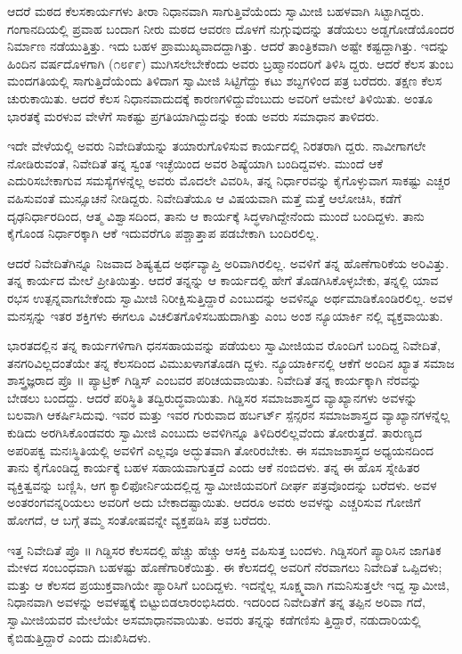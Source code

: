 ಆದರೆ ಮಠದ ಕೆಲಸಕಾರ್ಯಗಳು ತೀರಾ ನಿಧಾನವಾಗಿ ಸಾಗುತ್ತಿವೆಯೆಂದು ಸ್ವಾಮೀಜಿ ಬಹಳವಾಗಿ ಸಿಟ್ಟಾಗಿದ್ದರು. ಗಂಗಾನದಿಯಲ್ಲಿ ಪ್ರವಾಹ ಬಂದಾಗ ನೀರು ಮಠದ ಆವರಣ ದೊಳಗೆ ನುಗ್ಗುವುದನ್ನು ತಡೆಯಲು ಅಡ್ಡಗೋಡೆಯೊಂದರ ನಿರ್ಮಾಣ ನಡೆಯುತ್ತಿತ್ತು. ಇದು ಬಹಳ ಪ್ರಾಮುಖ್ಯವಾದದ್ದಾಗಿತ್ತು. ಆದರೆ ತಾಂತ್ರಿಕವಾಗಿ ಅಷ್ಟೇ ಕಷ್ಟದ್ದಾಗಿತ್ತು. ಇದನ್ನು ಹಿಂದಿನ ವರ್ಷದೊಳಗಾಗಿ (೧೮೯೯) ಮುಗಿಸಲೇಬೇಕೆಂದು ಅವರು ಬ್ರಹ್ಮಾನಂದರಿಗೆ ತಿಳಿಸಿ ದ್ದರು. ಆದರೆ ಕೆಲಸ ತುಂಬ ಮಂದಗತಿಯಲ್ಲಿ ಸಾಗುತ್ತಿದೆಯೆಂದು ತಿಳಿದಾಗ ಸ್ವಾಮೀಜಿ ಸಿಟ್ಟಿಗೆದ್ದು ಕಟು ಶಬ್ದಗಳಿಂದ ಪತ್ರ ಬರೆದರು. ತಕ್ಷಣ ಕೆಲಸ ಚುರುಕಾಯಿತು. ಆದರೆ ಕೆಲಸ ನಿಧಾನವಾದುದಕ್ಕೆ ಕಾರಣಗಳಿದ್ದುವೆಂಬುದು ಅವರಿಗೆ ಆಮೇಲೆ ತಿಳಿಯಿತು. ಅಂತೂ ಭಾರತಕ್ಕೆ ಮರಳುವ ವೇಳೆಗೆ ಸಾಕಷ್ಟು ಪ್ರಗತಿಯಾಗಿದ್ದುದನ್ನು ಕಂಡು ಅವರು ಸಮಾಧಾನ ತಾಳಿದರು.

ಇದೇ ವೇಳೆಯಲ್ಲಿ ಅವರು ನಿವೇದಿತೆಯನ್ನು ತಯಾರುಗೊಳಿಸುವ ಕಾರ್ಯದಲ್ಲಿ ನಿರತರಾಗಿ ದ್ದರು. ನಾವೀಗಾಗಲೇ ನೋಡಿರುವಂತೆ, ನಿವೇದಿತೆ ತನ್ನ ಸ್ವಂತ ಇಚ್ಛೆಯಿಂದ ಅವರ ಶಿಷ್ಯೆಯಾಗಿ ಬಂದಿದ್ದವಳು. ಮುಂದೆ ಆಕೆ ಎದುರಿಸಬೇಕಾಗುವ ಸಮಸ್ಯೆಗಳನ್ನೆಲ್ಲ ಅವರು ಮೊದಲೇ ವಿವರಿಸಿ, ತನ್ನ ನಿರ್ಧಾರವನ್ನು ಕೈಗೊಳ್ಳುವಾಗ ಸಾಕಷ್ಟು ಎಚ್ಚರ ವಹಿಸುವಂತೆ ಮುನ್ಸೂಚನೆ ನೀಡಿದ್ದರು. ನಿವೇದಿತೆಯೂ ಆ ವಿಷಯವಾಗಿ ಮತ್ತೆ ಮತ್ತೆ ಆಲೋಚಿಸಿ, ಕಡೆಗೆ ದೃಢನಿರ್ಧಾರದಿಂದ, ಆತ್ಮ ವಿಶ್ವಾಸದಿಂದ, ತಾನು ಆ ಕಾರ್ಯಕ್ಕೆ ಸಿದ್ಧಳಾಗಿದ್ದೇನೆಂದು ಮುಂದೆ ಬಂದಿದ್ದಳು. ತಾನು ಕೈಗೊಂಡ ನಿರ್ಧಾರಕ್ಕಾಗಿ ಆಕೆ ಇದುವರೆಗೂ ಪಶ್ಚಾತ್ತಾಪ ಪಡಬೇಕಾಗಿ ಬಂದಿರಲಿಲ್ಲ.

ಆದರೆ ನಿವೇದಿತೆಗಿನ್ನೂ ನಿಜವಾದ ಶಿಷ್ಯತ್ವದ ಅರ್ಥವ್ಯಾಪ್ತಿ ಅರಿವಾಗಿರಲಿಲ್ಲ. ಅವಳಿಗೆ ತನ್ನ ಹೊಣೆಗಾರಿಕೆಯ ಅರಿವಿತ್ತು. ತನ್ನ ಕಾರ್ಯದ ಮೇಲೆ ಪ್ರೀತಿಯಿತ್ತು. ಆದರೆ ತನ್ನನ್ನು ಆ ಕಾರ್ಯದಲ್ಲಿ ಹೇಗೆ ತೊಡಗಿಸಿಕೊಳ್ಳಬೇಕು, ತನ್ನಲ್ಲಿ ಯಾವ ರಭಸ ಉತ್ಪನ್ನವಾಗಬೇಕೆಂದು ಸ್ವಾಮೀಜಿ ನಿರೀಕ್ಷಿಸುತ್ತಿದ್ದಾರೆ ಎಂಬುದನ್ನು ಅವಳಿನ್ನೂ ಅರ್ಥಮಾಡಿಕೊಂಡಿರಲಿಲ್ಲ. ಅವಳ ಮನಸ್ಸನ್ನು ಇತರ ಶಕ್ತಿಗಳು ಈಗಲೂ ವಿಚಲಿತಗೊಳಿಸಬಹುದಾಗಿತ್ತು ಎಂಬ ಅಂಶ ನ್ಯೂಯಾರ್ಕಿ ನಲ್ಲಿ ವ್ಯಕ್ತವಾಯಿತು.

ಭಾರತದಲ್ಲಿನ ತನ್ನ ಕಾರ್ಯಗಳಿಗಾಗಿ ಧನಸಹಾಯವನ್ನು ಪಡೆಯಲು ಸ್ವಾಮೀಜಿಯವ ರೊಂದಿಗೆ ಬಂದಿದ್ದ ನಿವೇದಿತೆ, ತನಗರಿವಿಲ್ಲದಂತೆಯೇ ತನ್ನ ಕೆಲಸದಿಂದ ವಿಮುಖಳಾಗತೊಡಗಿ ದ್ದಳು. ನ್ಯೂಯಾರ್ಕಿನಲ್ಲಿ ಆಕೆಗೆ ಅಂದಿನ ಖ್ಯಾತ ಸಮಾಜ ಶಾಸ್ತ್ರಜ್ಞರಾದ ಪ್ರೊ ॥ ಪ್ಯಾಟ್ರಿಕ್ ಗಿಡ್ಡಿಸ್ ಎಂಬವರ ಪರಿಚಯವಾಯಿತು. ನಿವೇದಿತೆ ತನ್ನ ಕಾರ್ಯಕ್ಕಾಗಿ ನೆರವನ್ನು ಬೇಡಲು ಬಂದದ್ದು. ಆದರೆ ಪರಿಸ್ಥಿತಿ ತದ್ವಿರುದ್ಧವಾಯಿತು. ಗಿಡ್ಡಿಸರ ಸಮಾಜಶಾಸ್ತ್ರದ ವ್ಯಾಖ್ಯಾನಗಳು ಅವಳನ್ನು ಬಲವಾಗಿ ಆಕರ್ಷಿಸಿದುವು. ಇವರ ಮತ್ತು ಇವರ ಗುರುವಾದ ಹರ್ಬರ್ಟ್ ಸ್ಪೆನ್ಸರನ ಸಮಾಜಶಾಸ್ತ್ರದ ವ್ಯಾಖ್ಯಾನಗಳನ್ನೆಲ್ಲ ಕುಡಿದು ಅರಗಿಸಿಕೊಂಡವರು ಸ್ವಾಮೀಜಿ ಎಂಬುದು ಅವಳಿಗಿನ್ನೂ ತಿಳಿದಿರಲಿಲ್ಲವೆಂದು ತೋರುತ್ತದೆ. ತಾರುಣ್ಯದ ಅಪರಿಪಕ್ವ ಮನಃಸ್ಥಿತಿಯಲ್ಲಿ ಅವಳಿಗೆ ಎಲ್ಲವೂ ಅದ್ಭುತವಾಗಿ ತೋರಿರಬೇಕು. ಈ ಸಮಾಜಶಾಸ್ತ್ರದ ಅಧ್ಯಯನದಿಂದ ತಾನು ಕೈಗೊಂಡಿದ್ದ ಕಾರ್ಯಕ್ಕೆ ಬಹಳ ಸಹಾಯವಾಗುತ್ತದೆ ಎಂದು ಆಕೆ ನಂಬಿದಳು. ತನ್ನ ಈ ಹೊಸ ಸ್ನೇಹಿತರ ವ್ಯಕ್ತಿತ್ವವನ್ನು ಬಣ್ಣಿಸಿ, ಆಗ ಕ್ಯಾಲಿಫೋರ್ನಿಯದಲ್ಲಿದ್ದ ಸ್ವಾಮೀಜಿಯವರಿಗೆ ದೀರ್ಘ ಪತ್ರವೊಂದನ್ನು ಬರೆದಳು. ಅವಳ ಅಂತರಂಗವನ್ನರಿಯಲು ಅವರಿಗೆ ಅದು ಬೇಕಾದಷ್ಟಾಯಿತು. ಆದರೂ ಅವರು ಅವಳನ್ನು ಎಚ್ಚರಿಸುವ ಗೋಜಿಗೆ ಹೋಗದೆ, ಆ ಬಗ್ಗೆ ತಮ್ಮ ಸಂತೋಷವನ್ನೇ ವ್ಯಕ್ತಪಡಿಸಿ ಪತ್ರ ಬರೆದರು.

ಇತ್ತ ನಿವೇದಿತೆ ಪ್ರೊ ॥ ಗಿಡ್ಡಿಸರ ಕೆಲಸದಲ್ಲಿ ಹೆಚ್ಚು ಹೆಚ್ಚು ಆಸಕ್ತಿ ವಹಿಸುತ್ತ ಬಂದಳು. ಗಿಡ್ಡಿಸರಿಗೆ ಪ್ಯಾರಿಸಿನ ಜಾಗತಿಕ ಮೇಳದ ಸಂಬಂಧವಾಗಿ ಬಹಳಷ್ಟು ಹೊಣೆಗಾರಿಕೆಯಿತ್ತು. ಈ ಕೆಲಸದಲ್ಲಿ ಅವರಿಗೆ ನೆರವಾಗಲು ನಿವೇದಿತೆ ಒಪ್ಪಿದಳು; ಮತ್ತು ಆ ಕೆಲಸದ ಪ್ರಯುಕ್ತವಾಗಿಯೇ ಪ್ಯಾರಿಸಿಗೆ ಬಂದಿದ್ದಳು. ಇದನ್ನೆಲ್ಲ ಸೂಕ್ಷ್ಮವಾಗಿ ಗಮನಿಸುತ್ತಲೇ ಇದ್ದ ಸ್ವಾಮೀಜಿ, ನಿಧಾನವಾಗಿ ಅವಳನ್ನು ಅವಳಷ್ಟಕ್ಕೆ ಬಿಟ್ಟುಬಿಡಲಾರಂಭಿಸಿದರು. ಇದರಿಂದ ನಿವೇದಿತೆಗೆ ತನ್ನ ತಪ್ಪಿನ ಅರಿವಾ ಗದೆ, ಸ್ವಾಮೀಜಿಯವರ ಮೇಲೆಯೇ ಅಸಮಾಧಾನವಾಯಿತು. ಅವರು ತನ್ನನ್ನು ಕಡೆಗಣಿಸು ತ್ತಿದ್ದಾರೆ, ನಡುದಾರಿಯಲ್ಲಿ ಕೈಬಿಡುತ್ತಿದ್ದಾರೆ ಎಂದು ದುಃಖಿಸಿದಳು.

